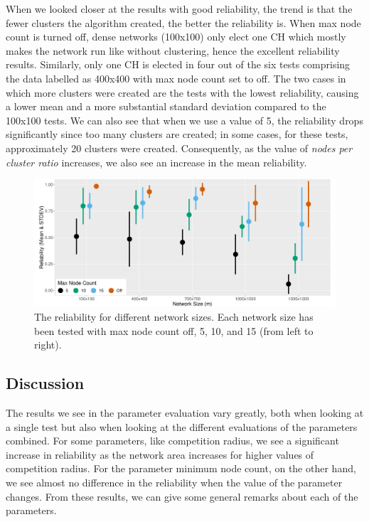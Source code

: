 When we looked closer at the results with good reliability, the trend is that the fewer clusters the algorithm created, the better the reliability is. When max node count is turned off, dense networks (100x100) only elect one CH which mostly makes the network run like \atwo{} without clustering, hence the excellent reliability results. Similarly, only one CH is elected in four out of the six tests comprising the data labelled as 400x400 with max node count set to off. The two cases in which more clusters were created are the tests with the lowest reliability, causing a lower mean and a more substantial standard deviation compared to the 100x100 tests. We can also see that when we use a value of 5, the reliability drops significantly since too many clusters are created; in some cases, for these tests, approximately 20 clusters were created. Consequently, as the value of \emph{nodes per cluster ratio} increases, we also see an increase in the mean reliability.



\begin{figure}[bt]
    \centering
    \includegraphics[width=\textwidth, keepaspectratio]{figure/Results/ParameterEvaluation/MaxNodeCount_Reliability.pdf}
    \caption{The reliability for different network sizes. Each network size has been tested with max node count off, 5, 10, and 15 (from left to right).}
    \label{fig:nodes-per-cluster-ratio-reliability}
\end{figure}


\subsection{Discussion}
The results we see in the parameter evaluation vary greatly, both when looking at a single test but also when looking at the different evaluations of the parameters combined. For some parameters, like competition radius, we see a significant increase in reliability as the network area increases for higher values of competition radius. For the parameter minimum node count, on the other hand, we see almost no difference in the reliability when the value of the parameter changes. From these results, we can give some general remarks about each of the parameters.


